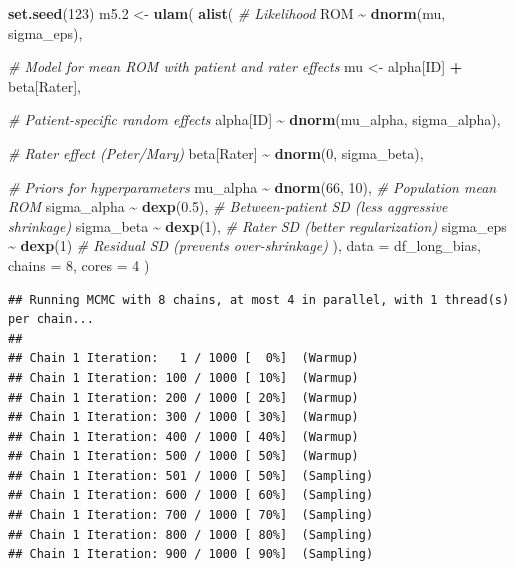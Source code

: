 \documentclass[
]{book}
\newenvironment{Shaded}{\begin{snugshade}}{\end{snugshade}}
\newcommand{\AttributeTok}[1]{\textcolor[rgb]{0.13,0.29,0.53}{#1}}
\newcommand{\CommentTok}[1]{\textcolor[rgb]{0.56,0.35,0.01}{\textit{#1}}}
\newcommand{\DecValTok}[1]{\textcolor[rgb]{0.00,0.00,0.81}{#1}}
\newcommand{\FloatTok}[1]{\textcolor[rgb]{0.00,0.00,0.81}{#1}}
\newcommand{\FunctionTok}[1]{\textcolor[rgb]{0.13,0.29,0.53}{\textbf{#1}}}
\newcommand{\NormalTok}[1]{#1}
\newcommand{\OtherTok}[1]{\textcolor[rgb]{0.56,0.35,0.01}{#1}}
\newcommand{\SpecialCharTok}[1]{\textcolor[rgb]{0.81,0.36,0.00}{\textbf{#1}}}
\begin{document}
\begin{Shaded}
\begin{Highlighting}[]
\FunctionTok{set.seed}\NormalTok{(}\DecValTok{123}\NormalTok{)}
\NormalTok{m5}\FloatTok{.2} \OtherTok{\textless{}{-}} \FunctionTok{ulam}\NormalTok{(}
  \FunctionTok{alist}\NormalTok{(}
    \CommentTok{\# Likelihood}
\NormalTok{    ROM }\SpecialCharTok{\textasciitilde{}} \FunctionTok{dnorm}\NormalTok{(mu, sigma\_eps),}
    
    \CommentTok{\# Model for mean ROM with patient and rater effects}
\NormalTok{    mu }\OtherTok{\textless{}{-}}\NormalTok{ alpha[ID] }\SpecialCharTok{+}\NormalTok{ beta[Rater],}
    
    \CommentTok{\# Patient{-}specific random effects}
\NormalTok{    alpha[ID] }\SpecialCharTok{\textasciitilde{}} \FunctionTok{dnorm}\NormalTok{(mu\_alpha, sigma\_alpha),}
    
    \CommentTok{\# Rater effect (Peter/Mary)}
\NormalTok{    beta[Rater] }\SpecialCharTok{\textasciitilde{}} \FunctionTok{dnorm}\NormalTok{(}\DecValTok{0}\NormalTok{, sigma\_beta),}
    
    \CommentTok{\# Priors for hyperparameters}
\NormalTok{    mu\_alpha }\SpecialCharTok{\textasciitilde{}} \FunctionTok{dnorm}\NormalTok{(}\DecValTok{66}\NormalTok{, }\DecValTok{10}\NormalTok{),  }\CommentTok{\# Population mean ROM}
\NormalTok{    sigma\_alpha }\SpecialCharTok{\textasciitilde{}} \FunctionTok{dexp}\NormalTok{(}\FloatTok{0.5}\NormalTok{),  }\CommentTok{\# Between{-}patient SD (less aggressive shrinkage)}
\NormalTok{    sigma\_beta }\SpecialCharTok{\textasciitilde{}} \FunctionTok{dexp}\NormalTok{(}\DecValTok{1}\NormalTok{),   }\CommentTok{\# Rater SD (better regularization)}
\NormalTok{    sigma\_eps }\SpecialCharTok{\textasciitilde{}} \FunctionTok{dexp}\NormalTok{(}\DecValTok{1}\NormalTok{)     }\CommentTok{\# Residual SD (prevents over{-}shrinkage)}
\NormalTok{  ), }
  \AttributeTok{data =}\NormalTok{ df\_long\_bias, }
  \AttributeTok{chains =} \DecValTok{8}\NormalTok{, }\AttributeTok{cores =} \DecValTok{4}
\NormalTok{)}
\end{Highlighting}
\end{Shaded}

\begin{verbatim}
## Running MCMC with 8 chains, at most 4 in parallel, with 1 thread(s) per chain...
## 
## Chain 1 Iteration:   1 / 1000 [  0%]  (Warmup) 
## Chain 1 Iteration: 100 / 1000 [ 10%]  (Warmup) 
## Chain 1 Iteration: 200 / 1000 [ 20%]  (Warmup) 
## Chain 1 Iteration: 300 / 1000 [ 30%]  (Warmup) 
## Chain 1 Iteration: 400 / 1000 [ 40%]  (Warmup) 
## Chain 1 Iteration: 500 / 1000 [ 50%]  (Warmup) 
## Chain 1 Iteration: 501 / 1000 [ 50%]  (Sampling) 
## Chain 1 Iteration: 600 / 1000 [ 60%]  (Sampling) 
## Chain 1 Iteration: 700 / 1000 [ 70%]  (Sampling) 
## Chain 1 Iteration: 800 / 1000 [ 80%]  (Sampling) 
## Chain 1 Iteration: 900 / 1000 [ 90%]  (Sampling)
\end{verbatim}
\end{document}
